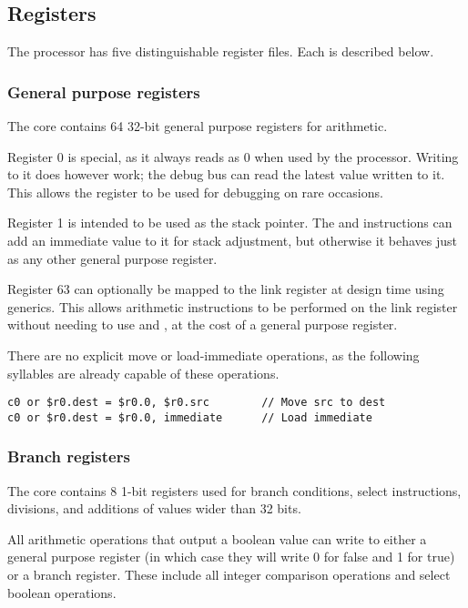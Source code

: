 \subsection{Registers}
\label{sec:core-ug-isa-regs}

The \rvex{} processor has five distinguishable register files. Each is described
below.

\subsubsection{General purpose registers}
\label{sec:core-ug-isa-regs-gp}

The \rvex{} core contains 64 32-bit general purpose registers for arithmetic.

Register 0 is special, as it always reads as 0 when used by the processor.
Writing to it does however work; the debug bus can read the latest value written
to it. This allows the register to be used for debugging on rare occasions.

Register 1 is intended to be used as the stack pointer. The  and
 instructions can add an immediate value to it for stack adjustment,
but otherwise it behaves just as any other general purpose register.

Register 63 can optionally be mapped to the link register at design time using
generics. This allows arithmetic instructions to be performed on the link
register without needing to use  and , at the cost of a
general purpose register.

There are no explicit move or load-immediate operations, as the following
syllables are already capable of these operations.

\begin{lstlisting}[numbers=none, basicstyle=\footnotesize, language=vexasm]
c0 or $r0.dest = $r0.0, $r0.src        // Move src to dest
c0 or $r0.dest = $r0.0, immediate      // Load immediate
\end{lstlisting}

\subsubsection{Branch registers}
\label{sec:core-ug-isa-regs-br}

The \rvex{} core contains 8 1-bit registers used for branch conditions, select
instructions, divisions, and additions of values wider than 32 bits.

All arithmetic operations that output a boolean value can write to either a
general purpose register (in which case they will write 0 for false and 1 for
true) or a branch register. These include all integer comparison operations and
select boolean operations.

